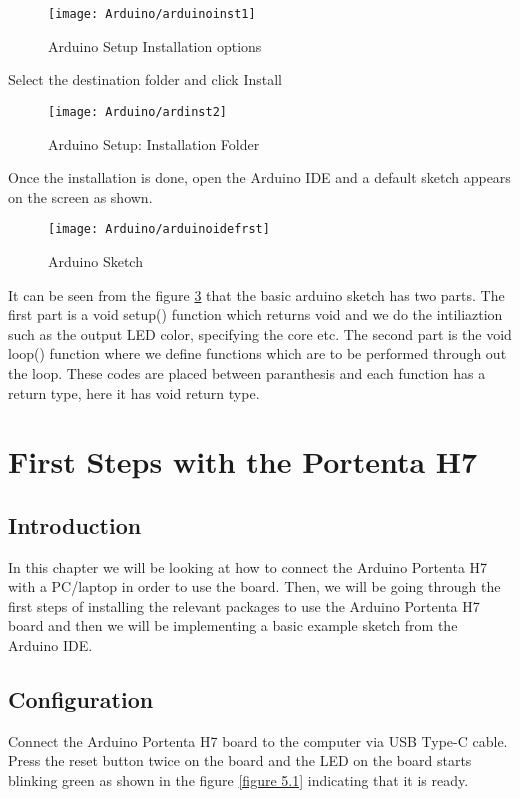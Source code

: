 \begin{figure}
	\centering
	\texttt{[image: Arduino/arduinoinst1]}
	\caption{Arduino Setup Installation options}\label{figure 4.3}
\end{figure}

Select the destination folder and click Install

\begin{figure}
	\centering
	\texttt{[image: Arduino/ardinst2]}
	\caption{Arduino Setup: Installation Folder}\label{figure 4.4}
\end{figure}

Once the installation is done, open the Arduino IDE and a default sketch appears on the screen as shown.

\begin{figure}
	\centering
	\texttt{[image: Arduino/arduinoidefrst]}
	\caption{Arduino Sketch}\label{figure 4.5}
\end{figure}

It can be seen from the figure \ref{figure 4.5} that the basic arduino sketch has two parts. The first part is a void setup() function which returns void and we do the intiliaztion such as the output LED color, specifying the core etc. The second part is the void loop() function where we define functions which are to be performed through out the loop. These codes are placed between paranthesis{} and each function has a return type, here it has void return type.
\vspace{-0.6cm}



\chapter{First Steps with the Portenta H7}

\section{Introduction}

In this chapter we will be looking at how to connect the Arduino Portenta H7 with a PC/laptop  in order to use the board. Then, we will be going through the first steps of installing the relevant packages to use the Arduino Portenta H7 board and then we will be implementing a basic example sketch from the Arduino IDE.

\section{Configuration}
Connect the Arduino Portenta H7 board to the computer via USB Type-C cable. Press the reset button twice on the board and the LED on the board starts blinking green as shown in the figure \ref{figure 5.1} indicating that it is ready.

